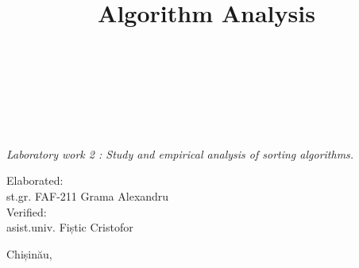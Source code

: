
\title{Algorithm Analysis}



\begin{titlepage}

    \textsc{\ministryname} \\
    \textsc{\universityname} \\
    \textsc{\facultyname} \\
    \textsc{\departmentname} \\
	
	\vfill
	
	{\LARGE \titleen \par}
	{\Large\emph{Laboratory work 2 : Study and empirical analysis of sorting algorithms. }  \par}
    \vfill


      \normalfont\large{Elaborated:} \hfill\hfill\hfill\\
                {st.gr. FAF-211} \hfill
                {Grama Alexandru}\\
      \normalfont\large{Verified:} \hfill\hfill\hfill\\
                {asist.univ.} \hfill
                {Fiștic Cristofor}                
                
    \hspace*{\fill}
	
	\vfill
    	


	{Chișinău, \degreeyear \par}

\end{titlepage}